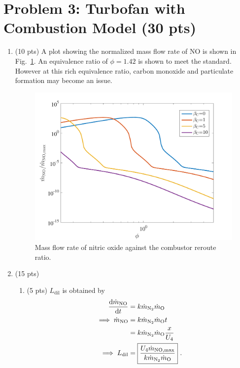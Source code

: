 \documentclass[12pt]{article}
\begin{document}
\section{Problem 3: Turbofan with Combustion Model (30 pts)}
	\begin{enumerate}[label=(\alph*)]
		\item (10 pts)
			A plot showing the normalized mass flow rate of NO is shown in Fig.~\ref{FIG_3}. An equivalence ratio of $\phi=1.42$ is shown to meet the standard. However at this rich equivalence ratio, carbon monoxide and particulate formation may become an issue.
			\begin{figure}[!t!]
				\begin{center}
					\includegraphics[width=120mm]{problem3.pdf}
					\caption{\label{FIG_3} Mass flow rate of nitric oxide against the combustor reroute ratio.}
				\end{center}
			\end{figure}
		\item (15 pts)
			\begin{enumerate}
				\item (5 pts)
					$L_\mathrm{dil}$ is obtained by
					\begin{equation}
						\begin{aligned}
							\frac{\d \dot{m}_\mathrm{NO}}{\d t}&=k\dot{m}_\mathrm{N_2}\dot{m}_\mathrm{O} \\
							\implies \dot{m}_\mathrm{NO} &= k\dot{m}_\mathrm{N_2}\dot{m}_\mathrm{O}t\\
							 &= k\dot{m}_\mathrm{N_2}\dot{m}_\mathrm{O}\frac{x}{U_4}\\
							 \implies L_\mathrm{dil}&=\boxed{\frac{U_4\dot{m}_\mathrm{NO,\max}}{k\dot{m}_\mathrm{N_2}\dot{m}_\mathrm{O}}}\ .

\end{aligned}
\end{equation}
\end{enumerate}
\end{enumerate}
\end{document}
